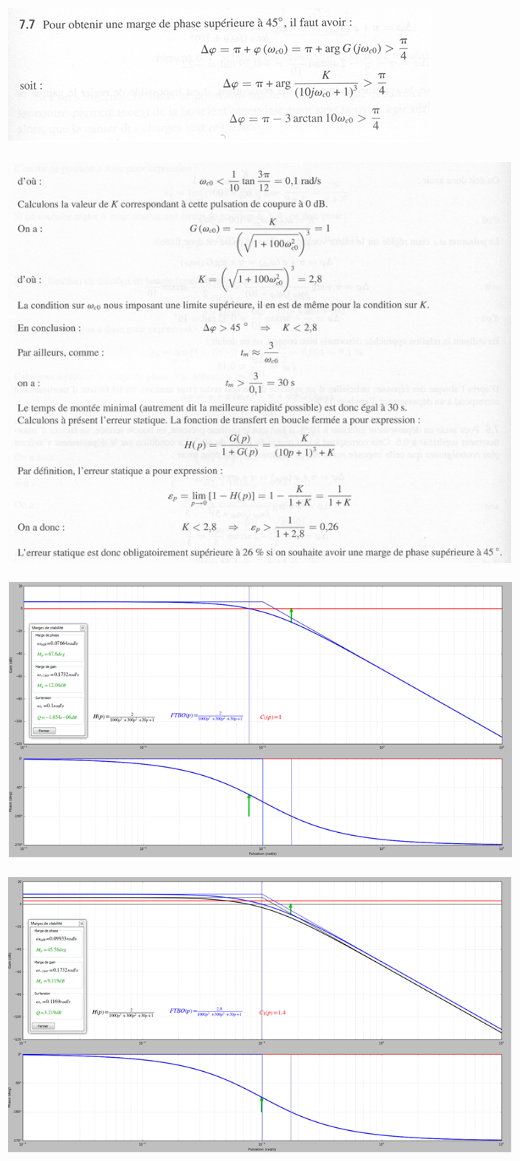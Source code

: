 \documentclass[10pt,fleqn]{article} %
\begin{document}
\begin{center}
\includegraphics[width=\linewidth]{images/cor_01}

\includegraphics[width=\linewidth]{images/cor_02}

\includegraphics[width=\linewidth]{images/cor_03}

\includegraphics[width=\linewidth]{images/cor_04}
\end{center}
\end{document}
